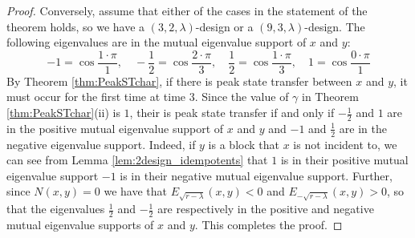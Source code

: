 \documentclass{article}
\numberwithin{equation}{section}
\begin{document}
\begin{proof}
Conversely, assume that either of the cases in the statement of the theorem holds, so we have a $(3,2,\lambda)$-design or a $(9,3,\lambda)$-design. The following eigenvalues are in the mutual eigenvalue support of $x$ and $y$:
\[
-1 = \cos \frac{1 \cdot \pi}{1},\quad
-\frac{1}{2} = \cos\frac{2\cdot \pi}{3}, \quad
\frac{1}{2} = \cos\frac{1 \cdot \pi}{3}, \quad
1 = \cos\frac{0\cdot \pi}{1}
\]
By Theorem \ref{thm:PeakSTchar}, if there is peak state transfer between $x$ and $y$, it must occur for the first time at time $3$. Since the value of $\gamma$ in Theorem \ref{thm:PeakSTchar}(ii) is $1$, their is peak state transfer if and only if $-\frac{1}{2}$ and $1$ are in the positive mutual eigenvalue support of $x$ and $y$ and $-1$ and $\frac{1}{2}$ are in the negative eigenvalue support. Indeed, if $y$ is a block that $x$ is not incident to, we can see from Lemma \ref{lem:2design_idempotents} that $1$ is in their positive mutual eigenvalue support $-1$ is in their negative mutual eigenvalue support. Further, since $N(x,y) = 0$ we have that $E_{\sqrt{r-\lambda}}(x,y) < 0$ and $E_{-\sqrt{r-\lambda}}(x,y) > 0$, so that the eigenvalues $\frac{1}{2}$ and $-\frac{1}{2}$ are respectively in the positive and negative mutual eigenvalue supports of $x$ and $y$. This completes the proof.
\end{proof}
\end{document}
